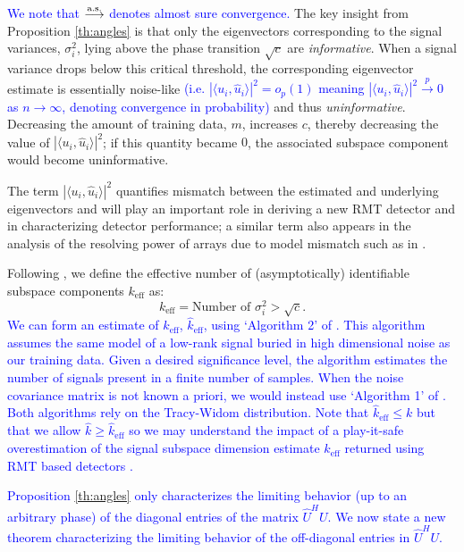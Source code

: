 \textcolor{blue}{We note that $\overset{\textrm{a.s.}}{\longrightarrow}$ denotes almost sure convergence.} The key insight from Proposition \ref{th:angles} is that only the eigenvectors corresponding to the signal variances, $\sigma_i^2$, lying above the phase transition $\sqrt{c}$ are \textit{informative}. When a signal variance drops below this critical threshold, the corresponding eigenvector estimate is essentially noise-like  \textcolor{blue}{(i.e. $|\langle u_i,\widehat{u}_i\rangle|^2=o_{p}(1)$ meaning $|\langle u_i,\widehat{u}_i\rangle|^2\overset{p}{\to}0$ as $n\to\infty$, denoting convergence in probability)} and thus \textit{uninformative}. Decreasing the amount of training data, $m$, increases $c$, thereby decreasing the value of $|\langle u_i,\widehat{u}_i\rangle|^2$; if this quantity became $0$, the associated subspace component would become uninformative.

The term $|\langle u_i,\widehat{u}_i\rangle|^2$ quantifies mismatch between the estimated and underlying eigenvectors and will play an important role in deriving a new RMT detector and in characterizing detector performance; a similar term also appears in the analysis of the resolving power of arrays due to model mismatch such as in \cite{cox1973resolving}.


Following \cite{nadakuditi2008sample}, we define the effective number of (asymptotically) identifiable subspace components $k_\text{eff}$ as:
\begin{equation}\label{eq:keff}
\boxed{k_\text{eff} = \text{Number of } \sigma_i^2 > \sqrt{c}}.
\end{equation}
\textcolor{blue}{We can form an estimate of $k_\text{eff}$, $\widehat{k}_{\text{eff}}$, using  `Algorithm 2' of  \cite{nadakuditi2010fundamental}. This algorithm assumes the same model of a low-rank signal buried in high dimensional noise as our training data. Given a desired significance level, the algorithm estimates the number of signals present in a finite number of samples. When the noise covariance matrix is not known a priori, we would instead use `Algorithm 1' of \cite{nadakuditi2010fundamental}. Both algorithms rely on the Tracy-Widom distribution. Note that $\widehat{k}_{\text{eff}} \leq k$ but that we allow $\widehat{k} \geq \widehat{k}_{\text{eff}}$ so we may understand the impact of a play-it-safe overestimation of the signal subspace dimension estimate $\widehat{k}_{\text{eff}}$  returned using RMT based detectors \cite{nadakuditi2010fundamental,johnstone2001distribution,el2007tracy}. }

\textcolor{blue}{Proposition \ref{th:angles} only characterizes the limiting behavior (up to an arbitrary phase) of  the diagonal entries of the matrix $\widehat{U}^HU$. We now state a new theorem characterizing the limiting behavior of the off-diagonal entries in $\widehat{U}^HU$.}

